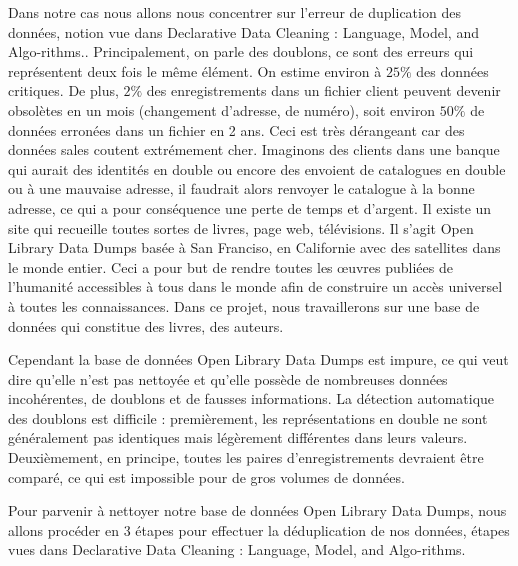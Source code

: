 \documentclass[12pt, a4paper]{article}
\begin{document}
Dans notre cas nous allons nous concentrer sur l'erreur de duplication des données, notion vue dans Declarative Data Cleaning : Language, Model, and Algo-rithms.\cite{Fan15}.
Principalement, on parle des doublons, ce sont des erreurs qui représentent deux fois le même élément.  On estime environ à $ 25\% $  des données critiques.  De plus, $ 2\% $ des enregistrements dans un fichier client peuvent devenir obsolètes en un mois (changement d’adresse, de numéro), soit environ $50\%$ de données erronées dans un fichier en 2 ans. Ceci est très dérangeant car des données sales coutent extrémement cher.
Imaginons des clients dans une banque qui aurait des identités en double ou encore des envoient de catalogues en double ou à une mauvaise adresse, il faudrait alors renvoyer le catalogue à la bonne adresse, ce qui a pour conséquence une perte de temps et d'argent.
Il existe un site qui recueille toutes sortes de livres, page web, télévisions. Il s’agit Open Library Data Dumps basée à San Franciso, en Californie avec des satellites dans le monde entier.  Ceci a pour but de rendre toutes les œuvres publiées de l’humanité accessibles à tous dans le monde afin de construire un accès universel à toutes les connaissances.
Dans ce projet, nous travaillerons sur une base de données qui constitue des livres, des auteurs.



  


Cependant la base de données Open Library Data Dumps est impure, ce qui veut dire qu’elle n’est pas nettoyée et qu’elle possède de nombreuses données incohérentes, de doublons et de fausses informations.
La détection automatique des doublons est difficile : premièrement, les représentations en double ne sont généralement pas identiques mais légèrement différentes dans leurs valeurs. Deuxièmement, en principe, toutes les paires d'enregistrements devraient être comparé, ce qui est impossible pour de gros volumes de données.



Pour parvenir à nettoyer notre base de données Open Library Data Dumps, nous allons procéder en 3 étapes pour effectuer la déduplication de nos données, étapes vues dans Declarative Data Cleaning : Language, Model, and Algo-rithms.\cite{galhardas:inria-00072476}
\end{document}
